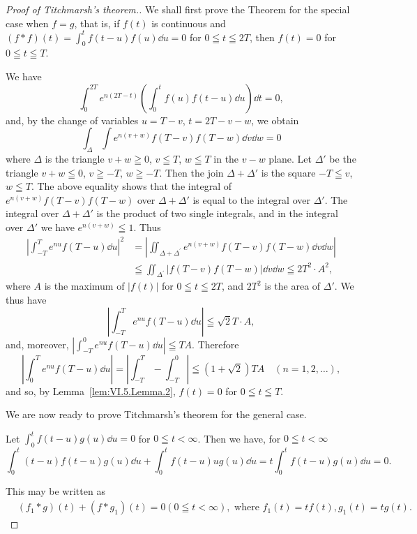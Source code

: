 \begin{proof}[Proof of Titchmarsh's theorem.]
 We shall first prove the Theorem for the special case when $f = g$, that is, if $f(t)$ is continuous and $(f * f)(t) = \int_{0}^{t} f(t - u)f(u)\dd u = 0$ for $0 \leqq t \leqq 2T$, then $f(t) = 0$ for $0 \leqq t \leqq T$. 

We have 
\[
\int_{0} ^{2T} e ^{n(2T-t)} \left(\int_{0} ^{t} f (u) f (t - u) \dd u\right) \dd t = 0,
\]
and, by the change of variables $u = T - v$, $t = 2T - v - w$, we obtain 
\[
\int_{\Delta} \int e ^{n(v+w)} f (T - v) f (T - w) \dd v \dd w = 0
\]
where $\Delta$ is the triangle $v + w \geqq 0$, $v \leqq T$, $w \leqq T$ in the $v - w$ plane. Let $\Delta'$ be the triangle $v + w \leqq 0$, $v \geqq -T$, $w \geqq -T$. Then the join $\Delta + \Delta'$ is the square $-T \leqq v$, $w \leqq T$. The above equality shows that the integral of $e^{n(v+w)} f(T - v)f(T - w)$ over $\Delta + \Delta'$ is equal to the integral over $\Delta'$. The integral over $\Delta + \Delta'$ is the product of two single integrals, and in the integral over $\Delta'$ we have $e^{n(v+w)} \leqq 1$. Thus 
\[
\begin{aligned} \left| \int_{-T} ^{T} e ^{nu} f (T - u) \dd u \right| ^{2} & = \left| \iint_ {\Delta + \Delta^{\prime}} e ^{n(v+w)} f (T - v) f (T - w) \dd v \dd w \right| \\ & \leqq \iint_ {\Delta^{\prime}} | f (T - v) f (T - w) | \dd v \dd w \leqq 2 T ^{2} \cdot A ^{2}, \end{aligned}
\]
where $A$ is the maximum of $|f(t)|$ for $0 \leqq t \leqq 2T$, and $2T^{2}$ is the area of $\Delta'$. We thus have 
\[
\left| \int_{-T} ^{T} e ^{nu} f (T - u) \dd u \right| \leqq \sqrt {2} T \cdot A,
\]
and, moreover, $\left|\int_{-T}^{0}e^{nu}f(T - u)\dd u\right| \leqq TA$. Therefore 
\[
\left| \int_{0} ^{T} e ^{nu} f (T - u) \dd u \right| = \left| \int_{-T} ^{T} - \int_{-T} ^{0} \right| \leqq (1 + \sqrt {2}) T A \quad (n = 1, 2, \dots),
\]
and so, by Lemma~\ref{lem:VI.5.Lemma.2}, $f(t) = 0$ for $0 \leqq t \leqq T$. 


We are now ready to prove Titchmarsh's theorem for the general case. 

Let $\int_0^t f(t - u)g(u)\dd u = 0$ for $0\leqq t < \infty$. Then we have, for $0\leqq t < \infty$ 
\[
\int_{0} ^{t} (t - u) f (t - u) g (u) \dd u + \int_{0} ^{t} f (t - u) u g (u) \dd u = t \int_{0} ^{t} f (t - u) g (u) \dd u = 0.
\]

This may be written as 
\[
\begin{aligned}
&\left(f _{1} * g\right) (t) + \left(f * g _{1}\right) (t) = 0 (0 \leqq t < \infty), \text{ where } f _{1} (t) = t f (t), g _{1} (t) = t g (t).
\end{aligned}
\]


\end{proof}
